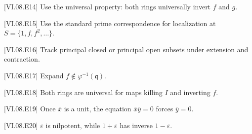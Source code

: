 \begin{hint}
[VI.08.E14]
Use the universal property: both rings universally invert $f$ and $g$.
\end{hint}
\begin{hint}
[VI.08.E15]
Use the standard prime correspondence for localization at $S=\{1,f,f^2,\dots\}$.
\end{hint}
\begin{hint}
[VI.08.E16]
Track principal closed or principal open subsets under extension and contraction.
\end{hint}
\begin{hint}
[VI.08.E17]
Expand $f\notin\varphi^{-1}(\mathfrak q)$.
\end{hint}
\begin{hint}
[VI.08.E18]
Both rings are universal for maps killing $I$ and inverting $f$.
\end{hint}
\begin{hint}
[VI.08.E19]
Once $\bar x$ is a unit, the equation $\bar x\bar y=0$ forces $\bar y=0$.
\end{hint}
\begin{hint}
[VI.08.E20]
$\varepsilon$ is nilpotent, while $1+\varepsilon$ has inverse $1-\varepsilon$.
\end{hint}
